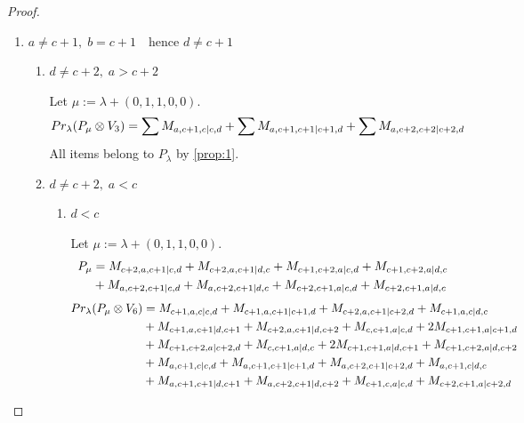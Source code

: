\begin{proof}
\begin{enumerate}
  \item $a\neq c+1,\; b=c+1 \quad \text{hence } d\neq c+1$
    \begin{enumerate}
      \item $ d\neq c+2,\; a>c+2  $ \par
        Let $\mu:=\lambda + (0,1,1,0,0) $.
        \begin{equation}\notag
          \begin{aligned}
            Pr_{\lambda}(P_\mu \otimes V_{3}) &=
\sum M_{a,c+1,c|c,d}
+\sum M_{a,c+1,c+1|c+1,d}
+\sum M_{a,c+2,c+2|c+2,d}
          \end{aligned}
        \end{equation}
All items belong to $P_\lambda$ by \cref{prop:1}.

      \item $ d\neq c+2,\; a<c  $ 
        \begin{enumerate}
          \item $d<c$ \par
        Let $\mu:=\lambda + (0,1,1,0,0) $.
        \begin{equation}\notag
          \begin{aligned}
            P_\mu &= M_{c+2,a,c+1|c,d}
+ M_{c+2,a,c+1|d,c}
+ M_{c+1,c+2,a|c,d}
+ M_{c+1,c+2,a|d,c}\\
                                               &
+ M_{a,c+2,c+1|c,d}
+ M_{a,c+2,c+1|d,c}
+ M_{c+2,c+1,a|c,d}
+ M_{c+2,c+1,a|d,c}
          \end{aligned}
        \end{equation}
        \begin{equation}\notag
          \begin{aligned}
            Pr_{\lambda}(P_\mu \otimes V_{6}) &=
M_{c+1,a,c|c,d}
+ M_{c+1,a,c+1|c+1,d}
+ M_{c+2,a,c+1|c+2,d}
+ M_{c+1,a,c|d,c}\\
                                               &
+ M_{c+1,a,c+1|d,c+1}
+ M_{c+2,a,c+1|d,c+2}
+ M_{c,c+1,a|c,d}
+ 2M_{c+1,c+1,a|c+1,d}\\
                                               &
+ M_{c+1,c+2,a|c+2,d}
+ M_{c,c+1,a|d,c}
+ 2M_{c+1,c+1,a|d,c+1}
+ M_{c+1,c+2,a|d,c+2}\\
                                               &
+ M_{a,c+1,c|c,d}
+ M_{a,c+1,c+1|c+1,d}
+ M_{a,c+2,c+1|c+2,d}
+ M_{a,c+1,c|d,c}\\
                                               &
+ M_{a,c+1,c+1|d,c+1}
+ M_{a,c+2,c+1|d,c+2}
+ M_{c+1,c,a|c,d}
+ M_{c+2,c+1,a|c+2,d}\\

\end{aligned}
\end{equation}
\end{enumerate}
\end{enumerate}
\end{enumerate}
\end{proof}
